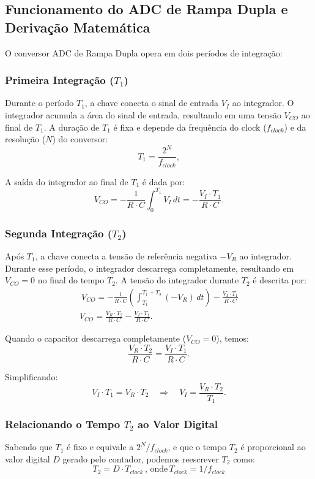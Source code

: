 \subsection{Funcionamento do ADC de Rampa Dupla e Derivação Matemática}
O conversor ADC de Rampa Dupla opera em dois períodos de integração:

\subsubsection{Primeira Integração ($T_1$)}
Durante o período $T_1$, a chave conecta o sinal de entrada $V_I$ ao integrador. O integrador acumula a área do sinal de entrada, resultando em uma tensão $V_{CO}$ ao final de $T_1$. A duração de $T_1$ é fixa e depende da frequência do clock ($f_{clock}$) e da resolução ($N$) do conversor:
$$
    T_1 = \frac{2^N}{f_{clock}},
$$

A saída do integrador ao final de $T_1$ é dada por:
$$
    V_{CO} = -\frac{1}{R \cdot C} \int_0^{T_1} V_I \, dt = -\frac{V_I \cdot T_1}{R \cdot C}.
$$


\subsubsection{Segunda Integração ($T_2$)}
Após $T_1$, a chave conecta a tensão de referência negativa $-V_R$ ao integrador. Durante esse período, o integrador descarrega completamente, resultando em $V_{CO} = 0$ no final do tempo $T_2$. A tensão do integrador durante $T_2$ é descrita por:
\begin{align} \
    V_{CO} = -\frac{1}{R \cdot C} \left(\int_{T_1}^{T_1 + T_2} (-V_R) \, dt \right) - \frac{V_I \cdot T_1}{R \cdot C} \\
    V_{CO} = \frac{V_R \cdot T_2}{R \cdot C} - \frac{V_I \cdot T_1}{R \cdot C}.
\end{align}

Quando o capacitor descarrega completamente ($V_{CO} = 0$), temos:
$$
    \frac{V_R \cdot T_2}{R \cdot C} = \frac{V_I \cdot T_1}{R \cdot C}.
$$

Simplificando:
$$
    V_I \cdot T_1 = V_R \cdot T_2 \quad \Rightarrow \quad V_I = \frac{V_R \cdot T_2}{T_1}.
$$

\subsubsection{Relacionando o Tempo $T_2$ ao Valor Digital}
Sabendo que $T_1$ é fixo e equivale a $2^N / f_{clock}$, e que o tempo $T_2$ é proporcional ao valor digital $D$ gerado pelo contador, podemos reescrever $T_2$ como:
$$
    T_2 = D \cdot T_{clock}\, \text{, onde}\, T_{clock} = 1 / f_{clock}
$$

